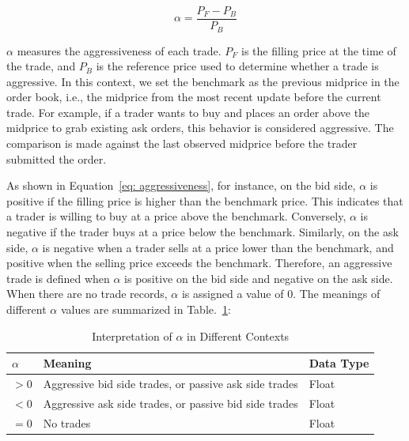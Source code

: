 \begin{equation}
    \alpha = \frac{P_F - P_B}{P_B}
    \label{eq: aggressiveness}
\end{equation}

$\alpha$ measures the aggressiveness of each trade. $P_F$ is the filling price at the time of the trade, and $P_B$ is the reference price used to determine whether a trade is aggressive. In this context, we set the benchmark as the previous midprice in the order book, i.e., the midprice from the most recent update before the current trade. For example, if a trader wants to buy and places an order above the midprice to grab existing ask orders, this behavior is considered aggressive. The comparison is made against the last observed midprice before the trader submitted the order. 

As shown in Equation~\ref{eq: aggressiveness}, for instance, on the bid side, $\alpha$ is positive if the filling price is higher than the benchmark price. This indicates that a trader is willing to buy at a price above the benchmark. Conversely, $\alpha$ is negative if the trader buys at a price below the benchmark. Similarly, on the ask side, $\alpha$ is negative when a trader sells at a price lower than the benchmark, and positive when the selling price exceeds the benchmark. Therefore, an aggressive trade is defined when $\alpha$ is positive on the bid side and negative on the ask side. When there are no trade records, $\alpha$ is assigned a value of 0. The meanings of different $\alpha$ values are summarized in Table.~\ref{tb: alpha_meaning}:
\begin{table}[h] 
    \centering 
    \begin{tabular}{lll} 
        \toprule 
        \textbf{$\alpha$} & \textbf{Meaning} & \textbf{Data Type} \\ 
        \midrule 
        $ > 0$ & Aggressive bid side trades, or passive ask side trades & Float \\
        $ < 0$ & Aggressive ask side trades, or passive bid side trades & Float \\ 
        $ = 0$ & No trades & Float \\  
        \bottomrule 
    \end{tabular} 
    \caption{Interpretation of $\alpha$ in Different Contexts}
    \label{tb: alpha_meaning}
\end{table}

